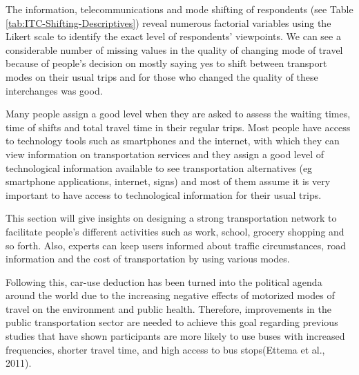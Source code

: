 \documentclass[
11pt, %
oneside, %
english, %
singlespacing, %
]{macthesis} %
\begin{document}
The information, telecommunications and mode shifting of respondents (see Table \ref{tab:ITC-Shifting-Descriptives}) reveal numerous factorial variables using the Likert scale to identify the exact level of respondents' viewpoints. We can see a considerable number of missing values in the quality of changing mode of travel because of people's decision on mostly saying yes to shift between transport modes on their usual trips and for those who changed the quality of these interchanges was good.

Many people assign a good level when they are asked to assess the waiting times, time of shifts and total travel time in their regular trips. Most people have access to technology tools such as smartphones and the internet, with which they can view information on transportation services and they assign a good level of technological information available to see transportation alternatives (eg smartphone applications, internet, signs) and most of them assume it is very important to have access to technological information for their usual trips.

This section will give insights on designing a strong transportation network to facilitate people's different activities such as work, school, grocery shopping and so forth. Also, experts can keep users informed about traffic circumstances, road information and the cost of transportation by using various modes.

Following this, car-use deduction has been turned into the political agenda around the world due to the increasing negative effects of motorized modes of travel on the environment and public health. Therefore, improvements in the public transportation sector are needed to achieve this goal regarding previous studies that have shown participants are more likely to use buses with increased frequencies, shorter travel time, and high access to bus stops(Ettema et al., 2011).
\end{document}
